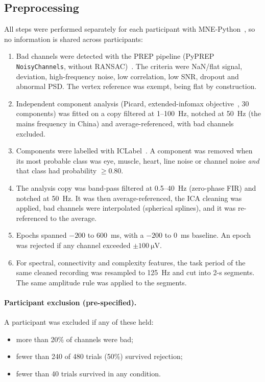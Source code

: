 \subsection{Preprocessing}
All steps were performed separately for each participant with MNE-Python~\cite{gramfort2013mne}, so no information
is shared across participants:
\begin{enumerate}
  \item Bad channels were detected with the PREP pipeline (PyPREP \texttt{NoisyChannels}, without
        RANSAC)~\cite{bigdely2015prep}. The criteria were NaN/flat signal, deviation, high-frequency noise, low
        correlation, low SNR, dropout and abnormal PSD. The vertex reference was exempt, being flat by construction.
  \item Independent component analysis (Picard, extended-infomax objective~\cite{ablin2018picard}, 30 components)
        was fitted on a copy filtered at 1--100~Hz, notched at 50~Hz (the mains frequency in China) and
        average-referenced, with bad channels excluded.
  \item Components were labelled with ICLabel~\cite{pion2019iclabel,li2022mneicalabel}. A component was removed when
        its most probable class was eye, muscle, heart, line noise or channel noise \emph{and} that class had
        probability $\ge 0.80$.
  \item The analysis copy was band-pass filtered at 0.5--40~Hz (zero-phase FIR) and notched at 50~Hz. It was then
        average-referenced, the ICA cleaning was applied, bad channels were interpolated (spherical splines), and it
        was re-referenced to the average.
  \item Epochs spanned $-200$ to $600$~ms, with a $-200$ to $0$~ms baseline. An epoch was rejected if any channel
        exceeded $\pm\SI{100}{\micro\volt}$.
  \item For spectral, connectivity and complexity features, the task period of the same cleaned recording was
        resampled to 125~Hz and cut into 2-s segments. The same amplitude rule was applied to the segments.
\end{enumerate}

\paragraph{Participant exclusion (pre-specified).}
A participant was excluded if any of these held:
\begin{itemize}
  \item more than 20\% of channels were bad;
  \item fewer than 240 of 480 trials (50\%) survived rejection;
  \item fewer than 40 trials survived in any condition.
\end{itemize}

